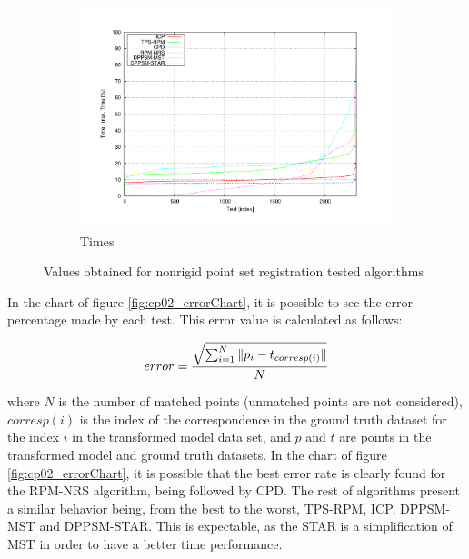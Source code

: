 \begin{figure}[t]
        \begin{subfigure}[b]{0.5\columnwidth}
                \centering
                \includegraphics[width=\textwidth, trim=50 45 80 50,clip]{fig20.pdf}
                \caption{Times}
                \label{fig:cp02_timesChart}
        \end{subfigure}%

        \caption{Values obtained for nonrigid point set registration tested algorithms}\label{fig:cp02_chartsRegistration}
\end{figure}

In the chart of figure \ref{fig:cp02_errorChart}, it is possible to see the error percentage made by each test. This 
error value is calculated as follows:

\begin{equation}\label{eq_errorCalculation}
error = { { \sqrt{ \sum_{i=1}^N \| p_i - t_{corresp(i)}\| } } \over N }
\end{equation}

where $N$ is the number of matched points (unmatched points are not considered), $corresp(i)$ is the index of the correspondence in the ground truth dataset for the index $i$ in the transformed model data set, and $p$ and $t$ are points in the transformed model and ground truth datasets.
In the chart of figure \ref{fig:cp02_errorChart}, it is possible that the best error rate is clearly found for the RPM-NRS 
algorithm, being followed by CPD.  The rest of algorithms present a similar behavior being, from the best to the 
worst, TPS-RPM, ICP, DPPSM-MST and DPPSM-STAR. This is expectable, as the STAR is a simplification of MST in order to 
have a better time performance.

